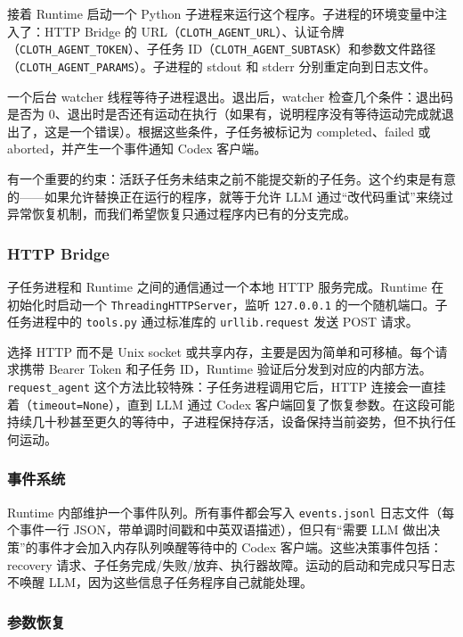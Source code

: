 接着 Runtime 启动一个 Python 子进程来运行这个程序。子进程的环境变量中注入了：HTTP Bridge 的 URL（\texttt{CLOTH\_AGENT\_URL}）、认证令牌（\texttt{CLOTH\_AGENT\_TOKEN}）、子任务 ID（\texttt{CLOTH\_AGENT\_SUBTASK}）和参数文件路径（\texttt{CLOTH\_AGENT\_PARAMS}）。子进程的 stdout 和 stderr 分别重定向到日志文件。

一个后台 watcher 线程等待子进程退出。退出后，watcher 检查几个条件：退出码是否为 0、退出时是否还有运动在执行（如果有，说明程序没有等待运动完成就退出了，这是一个错误）。根据这些条件，子任务被标记为 completed、failed 或 aborted，并产生一个事件通知 Codex 客户端。

有一个重要的约束：活跃子任务未结束之前不能提交新的子任务。这个约束是有意的——如果允许替换正在运行的程序，就等于允许 LLM 通过``改代码重试''来绕过异常恢复机制，而我们希望恢复只通过程序内已有的分支完成。

\subsubsection{HTTP Bridge}

子任务进程和 Runtime 之间的通信通过一个本地 HTTP 服务完成。Runtime 在初始化时启动一个 \texttt{ThreadingHTTPServer}，监听 \texttt{127.0.0.1} 的一个随机端口。子任务进程中的 \texttt{tools.py} 通过标准库的 \texttt{urllib.request} 发送 POST 请求。

选择 HTTP 而不是 Unix socket 或共享内存，主要是因为简单和可移植。每个请求携带 Bearer Token 和子任务 ID，Runtime 验证后分发到对应的内部方法。\texttt{request\_agent} 这个方法比较特殊：子任务进程调用它后，HTTP 连接会一直挂着（\texttt{timeout=None}），直到 LLM 通过 Codex 客户端回复了恢复参数。在这段可能持续几十秒甚至更久的等待中，子进程保持存活，设备保持当前姿势，但不执行任何运动。

\subsubsection{事件系统}

Runtime 内部维护一个事件队列。所有事件都会写入 \texttt{events.jsonl} 日志文件（每个事件一行 JSON，带单调时间戳和中英双语描述），但只有``需要 LLM 做出决策''的事件才会加入内存队列唤醒等待中的 Codex 客户端。这些决策事件包括：recovery 请求、子任务完成/失败/放弃、执行器故障。运动的启动和完成只写日志不唤醒 LLM，因为这些信息子任务程序自己就能处理。

\subsubsection{参数恢复}

